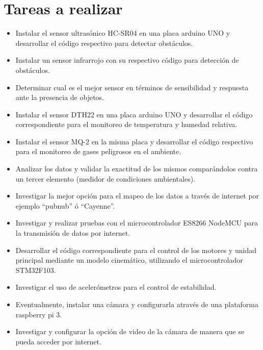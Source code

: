 \documentclass[12pt,letterpaper]{IEEEtran}
\begin{document}
\section{Tareas a realizar}
\begin{itemize}
  \item Instalar el sensor ultrasónico HC-SR04 en una placa arduino UNO y desarrollar el código respectivo para detectar obstáculos.
  \item Instalar un sensor infrarrojo con su respectivo código para detección de obstáculos.
  \item  Determinar cual es el mejor sensor en términos de sensibilidad y respuesta ante la presencia de objetos.
  \item Instalar el sensor DTH22 en una placa arduino UNO y desarrollar el código correspondiente para el monitoreo de temperatura y humedad relativa.
  \item Instalar el sensor MQ-2 en la misma placa y desarrollar el código respectivo para el monitoreo de gases peligrosos en el ambiente.
  \item  Analizar los datos y validar la exactitud de los mismos comparándolos contra un tercer elemento (medidor de condiciones ambientales).
  \item Investigar la mejor opción para el mapeo de los datos a través de internet por ejemplo ``pubnub'' ó ``Cayenne''.
  \item Investigar y realizar pruebas con el microcontrolador ES8266 NodeMCU para la transmisión de datos por internet.
  \item Desarrollar el código correspondiente para el control de los motores y unidad principal mediante un modelo cinemático, utilizando el microcontrolador STM32F103.
  \item Investigar el uso de acelerómetros para el control de estabilidad. 
  \item Eventualmente, instalar una cámara y configurarla através de una plataforma raspberry pi 3.
  \item Investigar y configurar la opción de video de la cámara de manera que se pueda acceder por internet.
  
   
 
   
\end{itemize}
\end{document}
